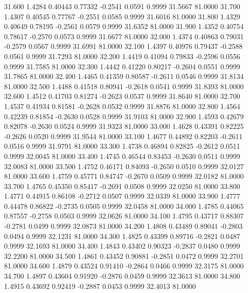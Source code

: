   31.600   1.4284   0.40443   0.77332  -0.2541   0.0591   0.9999  31.5667  81.0000
  31.700   1.4307   0.40545   0.77767  -0.2551   0.0585   0.9999  31.6016  81.0000
  31.800   1.4329   0.40649   0.78195  -0.2561   0.0579   0.9999  31.6352  81.0000
  31.900   1.4352   0.40754   0.78617  -0.2570   0.0573   0.9999  31.6677  81.0000
  32.000   1.4374   0.40863   0.79031  -0.2579   0.0567   0.9999  31.6991  81.0000
  32.100   1.4397   0.40976   0.79437  -0.2588   0.0561   0.9999  31.7293  81.0000
  32.200   1.4419   0.41094   0.79833  -0.2596   0.0556   0.9999  31.7585  81.0000
  32.300   1.4442   0.41220   0.80217  -0.2604   0.0551   0.9999  31.7865  81.0000
  32.400   1.4465   0.41359   0.80587  -0.2611   0.0546   0.9999  31.8134  81.0000
  32.500   1.4488   0.41518   0.80941  -0.2618   0.0541   0.9999  31.8393  81.0000
  32.600   1.4512   0.41703   0.81274  -0.2623   0.0537   0.9999  31.8640  81.0000
  32.700   1.4537   0.41934   0.81581  -0.2628   0.0532   0.9999  31.8876  81.0000
  32.800   1.4564   0.42239   0.81854  -0.2630   0.0528   0.9999  31.9103  81.0000
  32.900   1.4593   0.42679   0.82078  -0.2630   0.0524   0.9999  31.9323  81.0000
  33.000   1.4628   0.43391   0.82225  -0.2626   0.0520   0.9999  31.9544  81.0000
  33.100   1.4677   0.44892   0.82203  -0.2611   0.0516   0.9999  31.9791  81.0000
  33.300   1.4738   0.46894   0.82825  -0.2612   0.0511   0.9999  32.0045  81.0000
  33.400   1.4745   0.46544   0.83453  -0.2630   0.0511   0.9999  32.0083  81.0000
  33.500   1.4752   0.46171   0.84093  -0.2650   0.0510   0.9999  32.0127  81.0000
  33.600   1.4759   0.45771   0.84747  -0.2670   0.0509   0.9999  32.0182  81.0000
  33.700   1.4765   0.45350   0.85417  -0.2691   0.0508   0.9999  32.0250  81.0000
  33.800   1.4771   0.44915   0.86108  -0.2712   0.0507   0.9999  32.0339  81.0000
  33.900   1.4777   0.44478   0.86822  -0.2735   0.0505   0.9999  32.0458  81.0000
  34.000   1.4785   0.44065   0.87557  -0.2758   0.0503   0.9999  32.0626  81.0000
  34.100   1.4795   0.43717   0.88307  -0.2781   0.0499   0.9999  32.0873  81.0000
  34.200   1.4808   0.43489   0.89041  -0.2803   0.0494   0.9999  32.1231  81.0000
  34.300   1.4825   0.43399   0.89716  -0.2821   0.0487   0.9999  32.1693  81.0000
  34.400   1.4843   0.43402   0.90323  -0.2837   0.0480   0.9999  32.2200  81.0000
  34.500   1.4861   0.43452   0.90881  -0.2851   0.0472   0.9999  32.2701  81.0000
  34.600   1.4879   0.43524   0.91410  -0.2864   0.0466   0.9999  32.3175  81.0000
  34.700   1.4897   0.43604   0.91920  -0.2876   0.0459   0.9999  32.3613  81.0000
  34.800   1.4915   0.43692   0.92419  -0.2887   0.0453   0.9999  32.4013  81.0000
